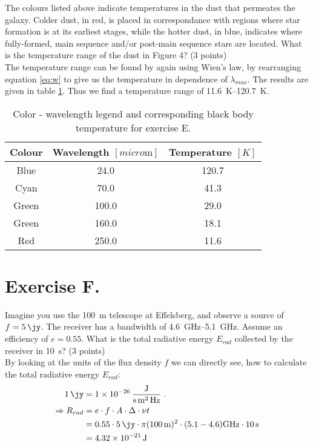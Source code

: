 \documentclass[11pt,a4paper,twoside]{article}
\begin{document}
The colours listed above indicate temperatures in the dust that permeates the
galaxy.  Colder dust, in red, is placed in correspondance with regions where
star formation is at its earliest stages, while the hotter dust, in blue,
indicates where fully-formed, main sequence and/or post-main sequence stars are
located.  What is the temperature range of the dust in Figure 4? (3 points) \\

The temperature range can be found by again using Wien's law, by rearranging
equation \ref{eq:w} to give us the temperature in dependence of $\lambda_{max}$.
The results are given in table \ref{tab:col}. Thus we find a temperature range
of  \SIrange{11.6}{120.7}{\kelvin}.

\begin{table}[h!]
\centering
\begin{tabular}{ccc}\toprule
Colour  & Wavelength $[\si{micro\meter}]$  & Temperature $[K]$  \\ \midrule
Blue    & 24.0  & 120.7                \\
Cyan    & 70.0  & 41.3                \\
Green   & 100.0 & 29.0                \\
Green   & 160.0 & 18.1                \\
Red     & 250.0 & 11.6               \\
\bottomrule
\end{tabular}
\caption{Color - wavelength legend and corresponding black body temperature for
         exercise E.}
\label{tab:col}
\end{table}


\section*{Exercise F.}

Imagine you use the \SI{100}{\meter} telescope at Effelsberg, and observe a
source of $f = \SI{5}{\jy}$. The receiver has a bandwidth of
\SIrange{4.6}{5.1}{\giga\hertz}. Assume an efficiency of $e=0.55$.  What is the
total radiative energy $E_{rad}$ collected by the receiver in \SI{10}{\second}? (3
points) \\

By looking at the units of the flux density $f$ we can directly see, how to 
calculate the total radiative energy $E_{rad}$:
\begin{align}
\SI{1}{\jy} &= \SI[per-mode=fraction]{1e-26}{\joule\per\second\per\meter\squared\per\hertz}\;. \\
\Rightarrow
R_{rad} &= e \cdot f \cdot A \cdot \Delta \cdot \nu t \\
&= 0.55 \cdot \SI{5}{\jy} \cdot \pi(\SI{100}{\meter})^2 \cdot (5.1-4.6)\si{\giga\hertz} \cdot \SI{10}{\second} \\
&= \SI{4.32e-21}{\joule}
\end{align}
\end{document}
